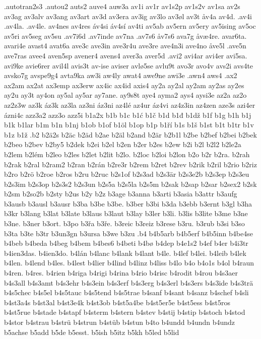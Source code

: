 .autotran2s3
.autou2
auts2
auve4
auw3a
av1i
av1r
av1s2p
av1s2v
av1sa
av2s
av3ag
av3alv
av3ang
av3art
av3d
av3era
av3ig
av3lo
av3øl
av3t
åv4a
av4d.
.av4i
.av4la.
.av4le.
av4nes
av4res
áv4si
áv4sí
av4ti
av5ab
av5ern
av5ery
av5ising
av5oc
av5ri
av5seg
av5su
.av7i6d
.av7inde
av7na
.av7s6
åv7s6
ava7g
åvæ4re.
avar6ta.
avari4e
avast4
avat6a
ave3c
ave3in
ave3r4u
ave3re
ave4n3i
ave4no
åve5l
.ave5n
ave7ras
avee4
aven5sp
avener4
avens4
aver3a
aver5d
.avi2
avi4ar
avi4er
avi5sa.
avi9ke
avie6rer
avil4l
avis3t
av-ise
aviser
avlø5se
avlu9t
avo3r
avo4v
avs2i
avs4te
avsko7g
avspe9g4
avta9ka
aw3i
aw4ly
awat4
awe9ne
awi3e
.awn4
aws4
.ax2
ax2am
ax2at
ax3emp
ax3erw
ax4ic
ax4id
axis4
ay2a
ay2al
ay2am
ay2as
ay2es
ay2u
ay3t
ay4on
ay5al
ay5ar
ay7ane.
ay9s8t
aye4
ayma2
ays4
aysi3e
az2a
az2o
az2z3w
az3k
áz3k
az3la
az3ni
áz3ni
az4lé
az4ur
áz4vi
az4z3in
az4zen
aze3s
azi4er
ázni4c
azz3a2
azz3o
azz5i
b1a2x
b1b
b1c
b1ć
b1č
b1d
b1đ
b1dž
b1f
b1g
b1h
b1j
b1k
b1lar
b1m
b1n
b1nj
b1ob
b1of
b1öl
b1op
b1p
b1ří
b1s
b1š
b1st
b1t
b1tr
b1v
b1z
b1ž
.b2
b2ä2s
b2äc
b2äd
b2ae
b2äl
b2and
b2är
b2b1l
b2be
b2bef
b2bei
b2bek
b2beo
b2bev
b2by5
b2dek
b2ei
b2el
b2en
b2er
b2es
b2ew
b2i
b2l
b2l2
b2le2a
b2lem
b2lém
b2leo
b2les
b2let
b2lit
b2lo.
b2loc
b2loi
b2lon
b2o
b2r
b2ra.
b2rah
b2rak
b2ral
b2ram2
b2ran
b2rán
b2re3r
b2rem
b2ret
b2rev
b2rik
b2ril
b2rio
b2riz
b2ro
b2rö
b2roe
b2ros
b2ru
b2ruc
b2s1of
b2s3ad
b2s3är
b2s3e2b
b2s3ep
b2s3eu
b2s3im
b2s3op
b2s3s2
b2s3un
b2s5a
b2s5la
b2s5m
b2sak
b2sap
b2sar
b2sex2
b2sk
b2sm
b2so2b
b2sty
b2us
b2y
b2z
b3age
b3anna
b3arti
b3asia
b3attr
b3aufg
b3ausb
b3ausl
b3ausr
b3ba
b3be
b3be.
b3ber
b3bi
b3da
b3ebb
b3ernt
b3gl
b3ha
b3kr
b3lang
b3lat
b3late
b3laus
b3laut
b3lay
b3ler
b3li.
b3lis
b3lite
b3me
b3ne
b3ne.
b3ner
b3ort.
b3po
b3řa
b3ře.
b3reic
b3reiz
b3rese
b3ru.
b3rub
b3si
b3so
b3ta
b3te
b3tr
b3un3gn
b3ursa
b3we
b3zu
.b4
b4b5arb
b4b5erf
b4b5inn
b4be4se
b4beb
b4beda
b4beg
b4bem
b4bes6
b4beti
b4bø
b4dep
b4e1s2
b4ef
b4er
b4i3tr
b4ien3das.
b4ien3do.
b4lán
b4lanc
b4lank
b4lant
b4le.
b4lef
b4lei.
b4leib
b4lek
b4len.
b4lend
b4les.
b4lest
b4lier
b4lind
b4linz
b4liss
b4lo
b4o
b4o1s
b4ol
b4raun
b4ren.
b4res.
b4rien
b4riga
b4rigi
b4rina
b4rio
b4risc
b4rodit
b4rou
b4s3aer
b4s3all
b4s3amt
b4s3ehr
b4s3ein
b4s3erf
b4s3erg
b4s3erl
b4s3ers
b4s3ide
b4s3trä
b4s5chec
b4s5el
b4s5tauc
b4s5tend
b4s5trae
b4sanf
b4sant
b4sanz
b4schef
b4sli
b4st3a4s
b4st3al
b4st3e4k
b4st3ob
b4st5a4be
b4st5er5e
b4st5ess
b4st5ros
b4st5rue
b4stade
b4stapf
b4sterm
b4stern
b4stev
b4stij
b4stip
b4stoch
b4stod
b4stor
b4strau
b4strü
b4strun
b4stüb
b4stun
b4to
b4undd
b4undn
b4undz
b5achse
b5add
b5de
b5esst.
b5ish
b5itz
b5kh
b5led
b5lid
